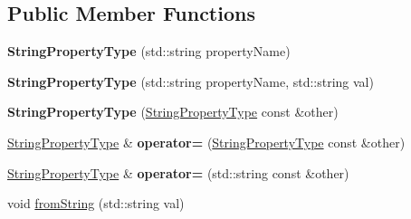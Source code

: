 \subsection*{Public Member Functions}
\begin{DoxyCompactItemize}
\item 
\hypertarget{classStringPropertyType_ac9474db13442001b615cb29b889844eb}{{\bfseries String\-Property\-Type} (std\-::string property\-Name)}\label{classStringPropertyType_ac9474db13442001b615cb29b889844eb}

\item 
\hypertarget{classStringPropertyType_a071f749092ee76790fb508f0ea8c974a}{{\bfseries String\-Property\-Type} (std\-::string property\-Name, std\-::string val)}\label{classStringPropertyType_a071f749092ee76790fb508f0ea8c974a}

\item 
\hypertarget{classStringPropertyType_a221e152eec4bfa2bab6e063dd7eb2108}{{\bfseries String\-Property\-Type} (\hyperlink{classStringPropertyType}{String\-Property\-Type} const \&other)}\label{classStringPropertyType_a221e152eec4bfa2bab6e063dd7eb2108}

\item 
\hypertarget{classStringPropertyType_a2eb25280c4494ff5f9aca137bf5040c7}{\hyperlink{classStringPropertyType}{String\-Property\-Type} \& {\bfseries operator=} (\hyperlink{classStringPropertyType}{String\-Property\-Type} const \&other)}\label{classStringPropertyType_a2eb25280c4494ff5f9aca137bf5040c7}

\item 
\hypertarget{classStringPropertyType_ad0ab1bb07b1374b04c819d9bfc3eea60}{\hyperlink{classStringPropertyType}{String\-Property\-Type} \& {\bfseries operator=} (std\-::string const \&other)}\label{classStringPropertyType_ad0ab1bb07b1374b04c819d9bfc3eea60}

\item 
\hypertarget{classStringPropertyType_ad9dd60fcfd9fd3ebaa578815c8d552fe}{void \hyperlink{classStringPropertyType_ad9dd60fcfd9fd3ebaa578815c8d552fe}{from\-String} (std\-::string val)}\label{classStringPropertyType_ad9dd60fcfd9fd3ebaa578815c8d552fe}


\end{DoxyCompactItemize}
